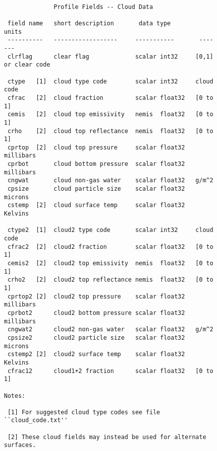 \documentclass[12pt]{article}
\begin{document}
\begin{figure}
{\small
\begin{verbatim}

              Profile Fields -- Cloud Data
  
 field name   short description       data type         units
 ----------   ------------------     -----------       -------
 clrflag      clear flag             scalar int32     [0,1] or clear code

 ctype   [1]  cloud type code        scalar int32     cloud code
 cfrac   [2]  cloud fraction         scalar float32   [0 to 1]
 cemis   [2]  cloud top emissivity   nemis  float32   [0 to 1]
 crho    [2]  cloud top reflectance  nemis  float32   [0 to 1]
 cprtop  [2]  cloud top pressure     scalar float32   millibars
 cprbot       cloud bottom pressure  scalar float32   millibars
 cngwat       cloud non-gas water    scalar float32   g/m^2
 cpsize       cloud particle size    scalar float32   microns
 cstemp  [2]  cloud surface temp     scalar float32   Kelvins

 ctype2  [1]  cloud2 type code       scalar int32     cloud code
 cfrac2  [2]  cloud2 fraction        scalar float32   [0 to 1]
 cemis2  [2]  cloud2 top emissivity  nemis  float32   [0 to 1]
 crho2   [2]  cloud2 top reflectance nemis  float32   [0 to 1]
 cprtop2 [2]  cloud2 top pressure    scalar float32   millibars
 cprbot2      cloud2 bottom pressure scalar float32   millibars
 cngwat2      cloud2 non-gas water   scalar float32   g/m^2
 cpsize2      cloud2 particle size   scalar float32   microns
 cstemp2 [2]  cloud2 surface temp    scalar float32   Kelvins
 cfrac12      cloud1+2 fraction      scalar float32   [0 to 1]

Notes:

 [1] For suggested cloud type codes see file ``cloud_code.txt''

 [2] These cloud fields may instead be used for alternate surfaces.
    
\end{verbatim}
}
\end{figure}
\end{document}
